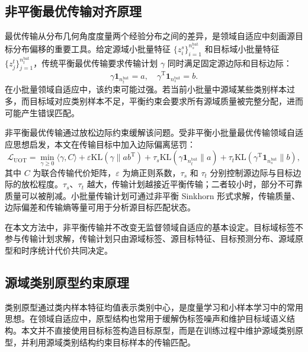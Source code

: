 \documentclass{seuthesis-2022}
\begin{document}
\subsection{非平衡最优传输对齐原理}

最优传输从分布几何角度度量两个经验分布之间的差异，是领域自适应中刻画源目标分布偏移的重要工具\cite{peyre2019computational,courty2017otda}。给定源域小批量特征 $\{z_i^s\}_{i=1}^{n_s^{\mathrm{bat}}}$ 和目标域小批量特征 $\{z_j^t\}_{j=1}^{n_t^{\mathrm{bat}}}$，传统平衡最优传输要求传输计划 $\gamma$ 同时满足固定源边际和目标边际：
\begin{equation}
    \gamma\mathbf{1}_{n_t^{\mathrm{bat}}}=a,\quad
    \gamma^{\mathrm T}\mathbf{1}_{n_s^{\mathrm{bat}}}=b.
\end{equation}
在小批量领域自适应中，该约束可能过强。若当前小批量中源域某些类别样本过多，而目标域对应类别样本不足，平衡约束会要求所有源域质量被完整分配，进而可能产生错误匹配。

非平衡最优传输通过放松边际约束缓解该问题。受非平衡小批量最优传输领域自适应思想启发\cite{fatras2021unbalanced}，本文在传输目标中加入边际偏离惩罚：
\begin{equation}
    \mathcal{L}_{\mathrm{UOT}}
    =
    \min_{\gamma\geq 0}
    \langle \gamma, C\rangle
    +
    \varepsilon \mathrm{KL}(\gamma\|ab^{\mathrm T})
    +
    \tau_s \mathrm{KL}(\gamma\mathbf{1}_{n_t^{\mathrm{bat}}}\|a)
    +
    \tau_t \mathrm{KL}(\gamma^{\mathrm T}\mathbf{1}_{n_s^{\mathrm{bat}}}\|b),
\end{equation}
其中 $C$ 为联合传输代价矩阵，$\varepsilon$ 为熵正则系数，$\tau_s$ 和 $\tau_t$ 分别控制源边际与目标边际的放松程度。$\tau_s$、$\tau_t$ 越大，传输计划越接近平衡传输；二者较小时，部分不可靠质量可以被削减。小批量传输计划可通过非平衡 Sinkhorn 形式求解，传输质量、边际偏差和传输熵等量可用于分析源目标匹配状态。

在本文方法中，非平衡传输并不改变无监督领域自适应的基本设定。目标域标签不参与传输计划求解，传输计划只由源域标签、源目标特征、目标预测分布、源域原型和时序统计代价共同决定。

\subsection{源域类别原型约束原理}

类别原型通过类内样本特征均值表示类别中心，是度量学习和小样本学习中的常用思想\cite{snell2017prototypical}。在领域自适应中，原型结构也常用于缓解伪标签噪声和维护目标域语义结构\cite{zhang2021proda}。本文并不直接使用目标标签构造目标原型，而是在训练过程中维护源域类别原型，并利用源域类别结构约束目标样本的传输匹配。
\end{document}
